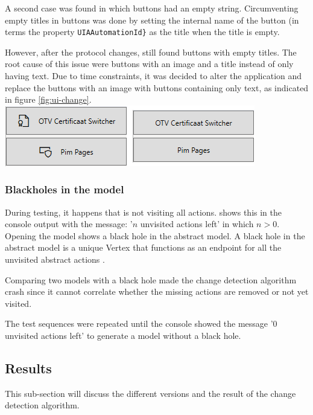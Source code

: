 A second case was found in which buttons had an empty string. Circumventing empty titles in buttons was done by setting the internal name of the button (in \testar terms the property \verb|UIAAutomationId}| as the title when the title is empty.

However, after the protocol changes, \testar still found buttons with empty titles. The root cause of this issue were buttons with an image and a title instead of only having text. Due to time constraints, it was decided to alter the application and replace the buttons with an image with buttons containing only text, as indicated in figure \ref{fig:ui-change}.\\

\begingroup
\captionsetup{type=figure}
\includegraphics[scale=1]{images/6-Experiment/ui-change.png}
\label{fig:ui-change}
\endgroup

\subsubsection{Blackholes in the model}
During testing, it happens that \testar is not visiting all actions. \testar shows this in the console output with the message: '$n$ unvisited actions left' in which $n > 0$. Opening the model shows a black hole in the abstract model. A black hole in the \testar abstract model is a unique Vertex that functions as an endpoint for all the unvisited abstract actions \cite{mulders2022Statemodel}. 

Comparing two models with a black hole made the change detection algorithm crash since it cannot correlate whether the missing actions are removed or not yet visited. 

The test sequences were repeated until the console showed the message  '0 unvisited actions left' to generate a model without a black hole.

\subsection{Results}
This sub-section will discuss the different versions and the result of the change detection algorithm.

